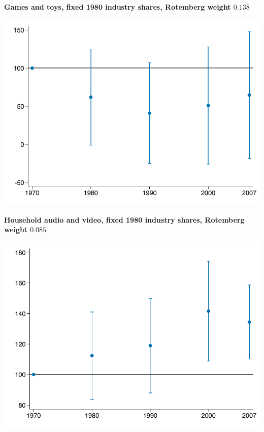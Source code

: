 \documentclass[notes,11pt, aspectratio=169]{beamer}
\begin{document}

\begin{frame}[label=ind3944_gr1980]
\textbf{Games and toys, fixed 1980 industry shares, Rotemberg weight $0.138$}


\begin{center}
		\includegraphics[scale=0.73]{images/share_emp_ind_bhj_3944_pre_trends_index1980.pdf}
\end{center}




\end{frame}








\begin{frame}[label=ind3651_gr1980]
\addtocounter{framenumber}{-1}
\textbf{Household audio and video, fixed 1980 industry shares, Rotemberg weight $ 0.085$}


\begin{center}
		\includegraphics[scale=0.73]{images/share_emp_ind_bhj_3651_pre_trends_index1980.pdf}
\end{center}




\end{frame}
\end{document}
